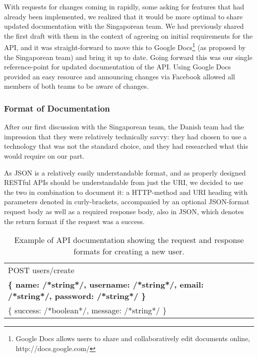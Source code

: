With requests for changes coming in rapidly, some asking for features that had already been implemented, we
realized that it would be more optimal to share updated documentation with the Singaporean team. We had previously
shared the first draft with them in the context of agreeing on initial requirements for the API, and it was
straight-forward to move this to Google Docs\footnote{Google Docs allows users to share and collaboratively edit
documents online, http://docs.google.com/} (as proposed by the Singaporean team) and bring it up to date. Going
forward this was our single reference-point for updated documentation of the API. Using Google Docs provided an easy
resource and announcing changes via Facebook allowed all members of both teams to be aware of changes.

\subsubsection{Format of Documentation}

After our first discussion with the Singaporean team, the Danish team had the impression that they were
relatively technically savvy: they had chosen to use a technology that was not the standard choice, and
they had researched what this would require on our part.

As JSON is a relatively easily understandable format, and as properly designed RESTful APIs should be
understandable from just the URI, we decided to use the two in combination to document it: a HTTP-method
and URI heading with parameters denoted in curly-brackets, accompanied by an optional JSON-format request
body as well as a required response body, also in JSON, which denotes the return format if the request was
a success.

\begin{table}[h]
    \begin{tabular}{ | l | }
        \hline
        POST users/create \\
        \textbf{\{ name: /*string*/, username: /*string*/, email: /*string*/, password: /*string*/ \}} \\
        \{ success: /*boolean*/, message: /*string*/ \} \\
        \hline
    \end{tabular}
    \caption{Example of API documentation showing the request and response formats for creating a new user.}
\end{table}

